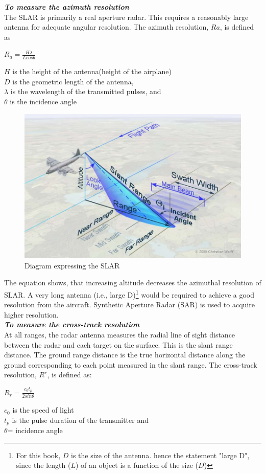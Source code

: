 \textbf{\textit{To measure the azimuth resolution}}\\
The SLAR is primarily a real aperture radar. This requires a reasonably large antenna for adequate angular resolution. The azimuth resolution, $ Ra $, is defined as
\begin{center}
$R_{a}=\frac{H \lambda}{L cos\theta}$
\end{center}
$ H $ is the height of the antenna(height of the airplane)\\
$ D $ is the geometric length of the antenna,\\
$\lambda$ is the wavelength of the transmitted pulses, and\\
$\theta$ is the incidence angle
\begin{figure}[h]
\centering
\includegraphics[scale=0.2]{./graphics/SLAR2}
\caption{Diagram expressing the SLAR}
\end{figure}

The equation shows, that increasing altitude decreases the azimuthal resolution of SLAR. A very long antenna (i.e., large D)\footnote{For this book, $D$ is the size of the antenna. hence the statement "large D", since the length ($L$) of an object is a function of the size ($D$)} would be required to achieve a good resolution from the aircraft. Synthetic Aperture Radar (SAR) is used to acquire higher resolution.\\

\textit{\textbf{To measure the cross-track resolution }}\\
At all ranges, the radar antenna measures the radial line of sight distance between the radar and each target on the surface. This is the slant range distance. The ground range distance is the true horizontal distance along the ground corresponding to each point measured in the slant range. The cross-track resolution, $R^{r}$, is defined as:  
\begin{center}
$R_{r}=\frac{c_{0} t_{p}}{2 sin\theta}$
\end{center}
$c_{0}$ is the speed of light\\
$t_{p}$ is the pulse duration of the transmitter and\\
$\theta$= incidence angle

